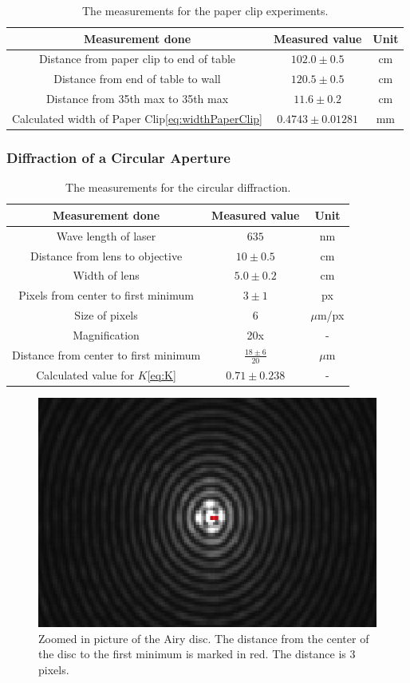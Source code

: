 \documentclass{emulateapj}
\begin{document}
\begin{table}[H]
\begin{tabular}{ c c c }
Measurement done & Measured value & Unit\\
\hline
Distance from paper clip to end of table & $102.0 \pm 0.5$ & cm \\
Distance from end of table to wall & $120.5 \pm 0.5$ & cm \\
Distance from 35th max to 35th max & $11.6 \pm 0.2$ & cm\\
Calculated width of Paper Clip\eqref{eq:widthPaperClip} & $0.4743 \pm 0.01281$ & mm
\end{tabular}
\caption{The measurements for the paper clip experiments.}
\end{table}\label{tab:dataPaperClip}

\subsubsection{Diffraction of a Circular Aperture}

\begin{table}[H]
\begin{tabular}{ c c c }
Measurement done & Measured value & Unit\\
\hline
Wave length of laser & $635$ & nm \\
Distance from lens to objective & $10 \pm 0.5$ & cm\\
Width of lens & $5.0 \pm 0.2$ & cm\\
Pixels from center to first minimum & $3 \pm 1$ & px\\
Size of pixels & $6$ & $\mu$m/px\\
Magnification & 20x & -\\
Distance from center to first minimum & $\frac{18 \pm 6}{20}$& $\mu$m\\
Calculated value for $K$\eqref{eq:K} &  $0.71 \pm 0.238$ & -
\end{tabular}
\caption{The measurements for the circular diffraction.}
\end{table}\label{tab:dataAiry}

\begin{figure}[H]
\centering
\includegraphics[scale=0.4]{Airy3zoomed2.png}
\caption{Zoomed in picture of the Airy disc. The distance from the center of the disc to the first minimum is marked in red. The distance is 3 pixels.}
\end{figure}\label{fig:airy}
\end{document}

